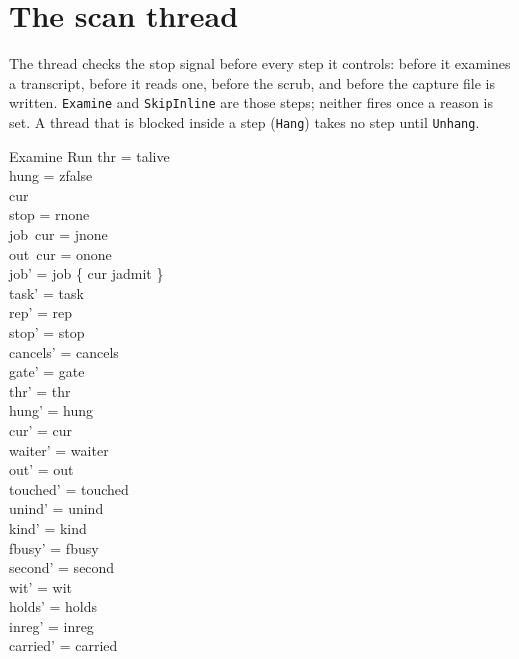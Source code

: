 \documentclass[a4paper,10pt,fleqn]{article}
\newcommand{\field}[1]{\texttt{#1}}
\begin{document}
\section{The scan thread}
\label{sec:thread}

The thread checks the stop signal before every step it controls: before it
examines a transcript, before it reads one, before the scrub, and before the
capture file is written. \field{Examine} and \field{SkipInline} are those steps;
neither fires once a reason is set. A thread that is blocked inside a step
(\field{Hang}) takes no step until \field{Unhang}.

\begin{schema}{Examine}
\Delta Run
\where
thr = talive \\
hung = zfalse \\
cur   \\
stop = rnone \\
job~cur = jnone \\
out~cur = onone \\
job' = job \oplus \{ cur \mapsto jadmit \} \\
task' = task \\
rep' = rep \\
stop' = stop \\
cancels' = cancels \\
gate' = gate \\
thr' = thr \\
hung' = hung \\
cur' = cur \\
waiter' = waiter \\
out' = out \\
touched' = touched \\
unind' = unind \\
kind' = kind \\
fbusy' = fbusy \\
second' = second \\
wit' = wit \\
holds' = holds \\
inreg' = inreg \\
carried' = carried
\end{schema}
\end{document}
